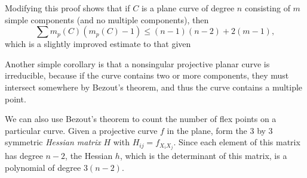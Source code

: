 \begin{remark}
    Modifying this proof shows that if $C$ is a plane curve of degree $n$ consisting of $m$ simple components (and no multiple components), then
    \[ \sum m_p(C) (m_p(C)-1) \leq (n-1)(n-2) + 2(m - 1), \]
    which is a slightly improved estimate to that given 
\end{remark}

Another simple corollary is that a nonsingular projective planar curve is irreducible, because if the curve contains two or more components, they must intersect somewhere by Bezout's theorem, and thus the curve contains a multiple point.

We can also use Bezout's theorem to count the number of flex points on a particular curve. Given a projective curve $f$ in the plane, form the 3 by 3 symmetric \emph{Hessian matrix} $H$ with $H_{ij} = f_{X_i X_j}$. Since each element of this matrix has degree $n-2$, the Hessian $h$, which is the determinant of this matrix, is a polynomial of degree $3(n-2)$.

